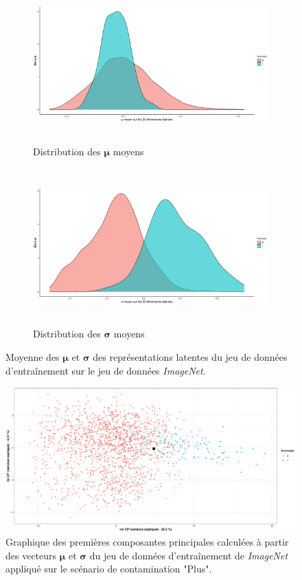 \begin{figure}[H]
	\centering
	\begin{subfigure}{12cm}
		\centering\includegraphics[width=12cm, height=6cm]{images/latent_stats/plot_mu}
		\caption{Distribution des $\boldsymbol{\mu}$ moyens}
	\end{subfigure}
	\begin{subfigure}{12cm}
		\centering\includegraphics[width=12cm, height=6cm]{images/latent_stats/plot_sigma}
		\caption{Distribution des $\boldsymbol{\sigma}$ moyens}
	\end{subfigure}
	\caption{Moyenne des $\boldsymbol{\mu}$ et $\boldsymbol{\sigma}$ des représentations latentes du jeu de données d'entraînement sur le jeu de données \textit{ImageNet}.}
	\label{fig:cars_latent_stats}
\end{figure}

\begin{figure}[htb]
	\centering
	\centering\includegraphics[width=\linewidth]{images/plot_pca_cars}
	\caption{Graphique des \DIFdelbeginFL {}\DIFdelendFL \DIFaddbeginFL {}\DIFaddendFL premières composantes principales calculées à partir des vecteurs $\boldsymbol{\mu}$ et $\boldsymbol{\sigma}$ du jeu de données d'entraînement de \textit{ImageNet} appliqué sur le scénario de contamination "Plus".}
	\label{fig:pca_cars}
\end{figure}


